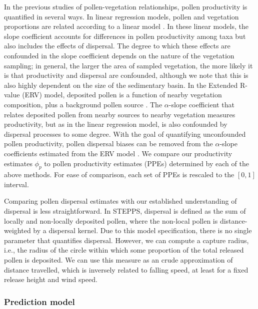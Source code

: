\documentclass[12pt]{article}
\begin{document}
In the previous studies of pollen-vegetation relationships, pollen
productivity is quantified in several ways. In linear regression
models, pollen and vegetation proportions are related according to a
linear model \citep{bradshaw1985relationships, jackson1990}. In these
linear models, the slope coefficient accounts for differences in
pollen productivity among taxa but also includes the effects of
dispersal. The degree to which these effects are confounded in the
slope coefficient depends on the nature of the vegetation sampling; in
general, the larger the area of sampled vegetation, the more likely it
is that productivity and dispersal are confounded, although we note
that this is also highly dependent on the size of the sedimentary
basin. In the Extended R-value (ERV) model, deposited pollen is a
function of nearby vegetation composition, plus a background pollen
source \citep{prentice1986, prentice1987quantitative,
  marquer2014holocene, brostrom2008pollen}. The $\alpha$-slope
coefficient that relates deposited pollen from nearby sources to
nearby vegetation measures productivity, but as in the linear
regression model, is also confounded by dispersal processes to some
degree. With the goal of quantifying unconfounded pollen productivity,
pollen dispersal biases can be removed from the $\alpha$-slope
coefficients estimated from the ERV model
\citep{sugita1999landscape}. We compare our productivity estimates
$\phi_p$ to pollen productivity estimates (PPEs) determined by each of
the above methods. For ease of comparison, each set of PPEs is
rescaled to the $[0,1]$ interval.

Comparing pollen dispersal estimates with our established
understanding of dispersal is less straightforward. In STEPPS,
dispersal is defined as the sum of locally and non-locally deposited
pollen, where the non-local pollen is distance-weighted by a dispersal
kernel. Due to this model specification, there is no single parameter
that quantifies dispersal. However, we can compute a capture radius,
i.e., the radius of the circle within which some proportion of the
total released pollen is deposited. We can use this measure as an
crude approximation of distance travelled, which is inversely related
to falling speed, at least for a fixed release height and
wind speed.

\subsubsection{Prediction model}
\label{sec:pred}
\end{document}
